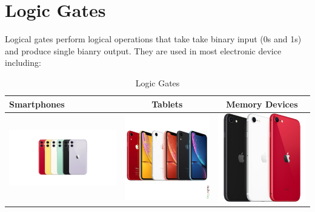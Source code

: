 \documentclass{article}
\begin{document}
	\section{Logic Gates}
	Logical gates perform logical operations that take take binary input (0s and 1s) and produce single bianry output. They are used in most electronic device including:
	
	\begin{table}[h!]
		\begin{center}
			\caption{Logic Gates}
			\label{tab:table1}
			\begin{tabular}{l|c|c}
		
				\hline
				Smartphones
				&
				Tablets
				&
				Memory Devices
				\\
				\hline
				\includegraphics[width=0.25\linewidth]{11.png}
				&
				\includegraphics[width=0.15\linewidth]{iphone xr.jpg}
				&
				\includegraphics[width=0.2\linewidth]{se.jpg}
			\end{tabular}
		\end{center}
	\end{table} 
\end{document}
